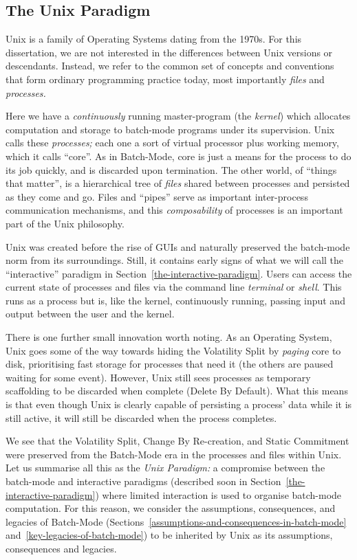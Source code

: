 \documentclass[ twoside,openright,titlepage,numbers=noenddot,headinclude,footinclude,cleardoublepage=empty,abstract=on,
                BCOR=5mm,paper=a4,fontsize=11pt
                ]{scrreprt}
\theoremstyle{definition}
\begin{document}
\hypertarget{the-unix-paradigm}{\subsection{The Unix Paradigm}\label{the-unix-paradigm}}

Unix is a family of Operating Systems dating from the 1970s. For this
dissertation, we are not interested in the differences between Unix
versions or descendants. Instead, we refer to the common set of concepts
and conventions that form ordinary programming practice today, most
importantly \emph{files} and \emph{processes.}

Here we have a \emph{continuously} running master-program (the
\emph{kernel}) which allocates computation and storage to batch-mode
programs under its supervision. Unix calls these \emph{processes;} each
one a sort of virtual processor plus working memory, which it calls
``core''. As in Batch-Mode, core is just a means for the process to do
its job quickly, and is discarded upon termination. The other world, of
``things that matter'', is a hierarchical tree of \emph{files} shared
between processes and persisted as they come and go. Files and ``pipes''
serve as important inter-process communication mechanisms, and this
\emph{composability} of processes is an important part of the Unix
philosophy.

Unix was created before the rise of \acp{GUI} and naturally preserved
the batch-mode norm from its surroundings. Still, it contains early
signs of what we will call the ``interactive'' paradigm in
Section~\ref{the-interactive-paradigm}. Users can access the current
state of processes and files via the command line \emph{terminal} or
\emph{shell}. This runs as a process but is, like the kernel,
continuously running, passing input and output between the user and the
kernel.

There is one further small innovation worth noting. As an Operating
System, Unix goes some of the way towards hiding the Volatility Split by
\emph{paging} core to disk, prioritising fast storage for processes that
need it (the others are paused waiting for some event). However, Unix
still sees processes as temporary scaffolding to be discarded when
complete (Delete By Default). What this means is that even though Unix
is clearly capable of persisting a process' data while it is still
active, it will still be discarded when the process completes.

We see that the Volatility Split, Change By Re-creation, and Static
Commitment were preserved from the Batch-Mode era in the processes and
files within Unix. Let us summarise all this as the \emph{Unix
Paradigm:} a compromise between the batch-mode and interactive paradigms
(described soon in Section~\ref{the-interactive-paradigm}) where limited
interaction is used to organise batch-mode computation. For this reason,
we consider the assumptions, consequences, and legacies of Batch-Mode
(Sections~\ref{assumptions-and-consequences-in-batch-mode}
and~\ref{key-legacies-of-batch-mode}) to be inherited by Unix as its
assumptions, consequences and legacies.
\end{document}

